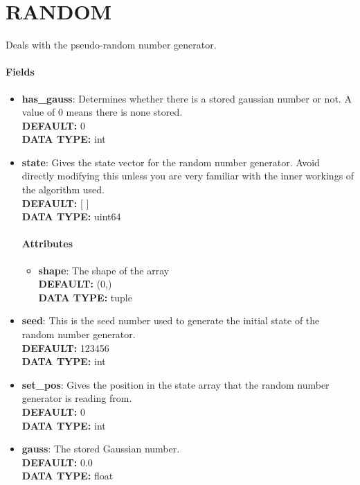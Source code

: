 \section{RANDOM}
\label{RANDOM}
Deals with the pseudo-random number generator.
\paragraph{Fields}
 \begin{itemize}
\item {\bf has\_gauss}:
 Determines whether there is a stored gaussian number or not. A value of 0 means there is none stored.
{\\ \bf DEFAULT: }0
{\\ \bf DATA TYPE: }int
\item {\bf state}:
 Gives the state vector for the random number generator. Avoid directly modifying this unless you are very familiar with the inner workings of the algorithm used.
{\\ \bf DEFAULT: }[ ]
{\\ \bf DATA TYPE: }uint64
\paragraph{Attributes}
 \begin{itemize}
\item {\bf shape}:
 The shape of the array
{\\ \bf DEFAULT: }(0,)
{\\ \bf DATA TYPE: }tuple
\end{itemize}
 
\item {\bf seed}:
 This is the seed number used to generate the initial state of the random number generator.
{\\ \bf DEFAULT: }123456
{\\ \bf DATA TYPE: }int
\item {\bf set\_pos}:
 Gives the position in the state array that the random number generator is reading from.
{\\ \bf DEFAULT: }0
{\\ \bf DATA TYPE: }int
\item {\bf gauss}:
 The stored Gaussian number.
{\\ \bf DEFAULT: }0.0
{\\ \bf DATA TYPE: }float
\end{itemize}
 
